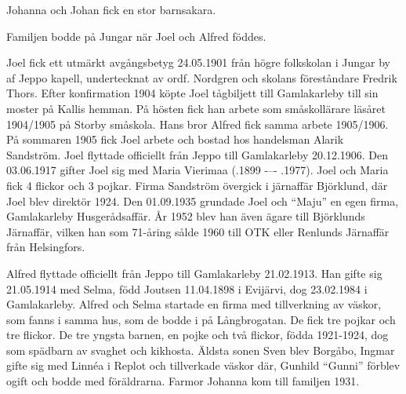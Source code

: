 Johanna och Johan fick en stor barnsakara.
\begin{jhchildren}
  \item {}
  \item {}
  \item {}
  \item {}
  \item {}
  \item {}
  \item {}
  \item {}
  \item {}
\end{jhchildren}
Familjen bodde på Jungar när Joel och Alfred föddes.

Joel fick ett utmärkt avgångsbetyg 24.05.1901 från högre folkskolan i Jungar by af Jeppo kapell, undertecknat av ordf. Nordgren och skolans	föreståndare Fredrik Thors. Efter konfirmation 1904 köpte Joel tågbiljett	till Gamlakarleby till sin moster på Kallis hemman. På hösten fick han arbete som småskollärare läsåret 1904/1905 på Storby småskola. Hans	bror Alfred fick samma arbete 1905/1906. På sommaren 1905 fick Joel arbete och bostad hos handelsman Alarik Sandström. Joel flyttade officiellt från Jeppo till Gamlakarleby 20.12.1906. Den 03.06.1917 gifter Joel sig med Maria Vierimaa (.1899  -–-  .1977). Joel och Maria fick 4 flickor och 3 pojkar. Firma Sandström övergick i järnaffär Björklund, där Joel blev direktör 1924. Den 01.09.1935 grundade Joel och ``Maju'' en egen firma, Gamlakarleby Husgerådsaffär. År 1952 blev	han även ägare till Björklunds Järnaffär, vilken han som 71-åring sålde 1960 till OTK eller Renlunds Järnaffär från Helsingfors.

Alfred flyttade officiellt från Jeppo till Gamlakarleby 21.02.1913. Han gifte sig 21.05.1914 med Selma, född Joutsen 11.04.1898 i Evijärvi, dog 23.02.1984 i Gamlakarleby. Alfred och Selma startade en firma med tillverkning av väskor, som fanns i samma hus, som de bodde i på Långbrogatan. De fick tre pojkar och tre flickor. De tre yngsta barnen, en pojke och två flickor, födda 1921-1924, dog som spädbarn av svaghet och kikhosta. Äldsta sonen Sven blev Borgåbo, Ingmar gifte sig med Linnéa i Replot och tillverkade väskor där, Gunhild ``Gunni'' förblev ogift och bodde med föräldrarna. Farmor Johanna kom till familjen 1931.

